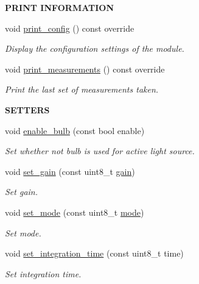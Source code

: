 \begin{Indent}{\bf P\+R\+I\+NT I\+N\+F\+O\+R\+M\+A\+T\+I\+ON}\par
\begin{DoxyCompactItemize}
\item 
void \hyperlink{class_loom___a_s7263_a19c0c1b6a4ae3ad0454011764cf54c70}{print\+\_\+config} () const override
\begin{DoxyCompactList}\small\item\em Display the configuration settings of the module. \end{DoxyCompactList}\item 
void \hyperlink{class_loom___a_s7263_a8b307fae00186fc4581c9e976badf30c}{print\+\_\+measurements} () const override
\begin{DoxyCompactList}\small\item\em Print the last set of measurements taken. \end{DoxyCompactList}\end{DoxyCompactItemize}
\end{Indent}
\begin{Indent}{\bf S\+E\+T\+T\+E\+RS}\par
\begin{DoxyCompactItemize}
\item 
void \hyperlink{class_loom___a_s7263_a750abf87ded862a2fe3a99ca1454b751}{enable\+\_\+bulb} (const bool enable)
\begin{DoxyCompactList}\small\item\em Set whether not bulb is used for active light source. \end{DoxyCompactList}\item 
void \hyperlink{class_loom___a_s7263_ad15997cbdd49276464b0e34396e5f674}{set\+\_\+gain} (const uint8\+\_\+t \hyperlink{class_loom___a_s7263_ab9b7223697e11e9a0ee4aa3a207f9be5}{gain})
\begin{DoxyCompactList}\small\item\em Set gain. \end{DoxyCompactList}\item 
void \hyperlink{class_loom___a_s7263_a0e602b1193c63c4302c8c942f1976292}{set\+\_\+mode} (const uint8\+\_\+t \hyperlink{class_loom___a_s7263_a3474bf1e38b6513f517f3e364d96df36}{mode})
\begin{DoxyCompactList}\small\item\em Set mode. \end{DoxyCompactList}\item 
void \hyperlink{class_loom___a_s7263_a73f1de066abbaf45cda7520da4f2b05d}{set\+\_\+integration\+\_\+time} (const uint8\+\_\+t time)
\begin{DoxyCompactList}\small\item\em Set integration time. \end{DoxyCompactList}\end{DoxyCompactItemize}
\end{Indent}
